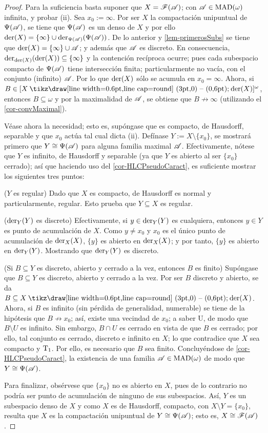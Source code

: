 \begin{proof}
	Para la suficiencia basta suponer que $X=\mathscr{F}(\mathscr{A})$; con $\mathscr{A} \in \operatorname{MAD}(\omega)$ infinita, y probar (ii). Sea $x_0:=\infty$. Por ser $X$ la compactación unipuntual de $\Psi(\mathscr{A})$, se tiene que $\Psi(\mathscr{A})$ es un denso de $X$ y por ello $\operatorname{der}(X) = \{\infty\} \cup \operatorname{der}_{\Psi(\mathscr{A})}(\Psi(\mathscr{A}))$. De lo anterior y \ref{lem-primerosSubs} se tiene que $\operatorname{der}(X) = \{\infty\} \cup \mathscr{A}$; y además que $\mathscr{A}$ es discreto. En consecuencia, $\operatorname{der}_{\operatorname{der}(X)}(\operatorname{der}(X)) \subseteq \{\infty\}$ y la contención recíproca ocurre; pues cada subespacio compacto de $\Psi(\mathscr{A})$ tiene intersección finita; particularmente no vacía, con el conjunto (infinito) $\mathscr{A}$. Por lo que $\operatorname{der}(X)$ sólo se acumula en $x_0=\infty$. Ahora, si $B \in [X \setminus \der(X)]^\omega$, entonces $B \subseteq \omega$ y por la maximalidad de $\mathscr{A}$, se obtiene que $B \not\to \infty$ (utilizando el \autoref{cor-convMaximal}).

	Véase ahora la necesidad; esto es, supóngase que es compacto, de Hausdorff, separable y que $x_0$ actúa tal cual dicta (ii). Defínase $Y:=X\setminus \{x_0\}$, se mostrará primero que $Y \cong \Psi(\mathscr{A})$ para alguna familia maximal $\mathscr{A}$. Efectivamente, nótese que $Y$ es infinito, de Hausdorff y separable (ya que $Y$ es abierto al ser $\{x_0\}$ cerrado); así que haciendo uso del \autoref{cor-HLCPseudoCaract}, es suficiente mostrar los siguientes tres puntos:

	($Y$ es regular) Dado que $X$ es compacto, de Hausdorff es normal y particularmente, regular. Esto prueba que $Y \subseteq X$ es regular.

	($\operatorname{der}_Y(Y)$ es discreto) Efectivamente, si $y \in \operatorname{der}_Y(Y)$ es cualquiera, entonces $y \in Y$ es punto de acumulación de $X$. Como $y \neq x_0$ y $x_0$ es el único punto de acumulación de $\operatorname{der}_X(X)$, $\{y\}$ es abierto en $\operatorname{der}_X(X)$; y por tanto, $\{y\}$ es abierto en $\operatorname{der}_Y(Y)$. Mostrando que $\operatorname{der}_Y(Y)$ es discreto.

	(Si $B \subseteq Y$ es discreto, abierto y cerrado a la vez, entonces $B$ es finito) Supóngase que $B \subseteq Y$ es discreto, abierto y cerrado a la vez. Por ser $B$ discreto y abierto, se da $B \subseteq X \setminus \der(X)$. Ahora, si $B$ es infinito (sin pérdida de generalidad, numerable) se tiene de la hipótesis que $B \not\to x_0$; así, existe una vecindad de $x_0$; a saber U, de modo que $B \setminus U$ es infinito. Sin embargo, $B \cap U$ es cerrado en vista de que $B$ es cerrado; por ello, tal conjunto es cerrado, discreto e infinito en $X$; lo que contradice que $X$ sea compacto y $\operatorname{T}_1$. Por ello, es necesario que $B$ sea finito. Concluyéndose de \ref{cor-HLCPseudoCaract}, la existencia de una familia $\mathscr{A}\in\operatorname{MAD}(\omega)$ de modo que $Y \cong \Psi(\mathscr{A})$.

	Para finalizar, obsérvese que $\{x_0\}$ no es abierto en $X$, pues de lo contrario no podría ser punto de acumulación de ninguno de sus subespacios. Así, $Y$ es un subespacio denso de $X$ y como $X$ es de Hausdorff, compacto, con $X \setminus Y = \{x_0\}$, resulta que $X$ es la compactación unipuntual de $Y \cong \Psi(\mathscr{A})$; esto es, $X \cong \mathscr{F}(\mathscr{A})$.
\end{proof}

